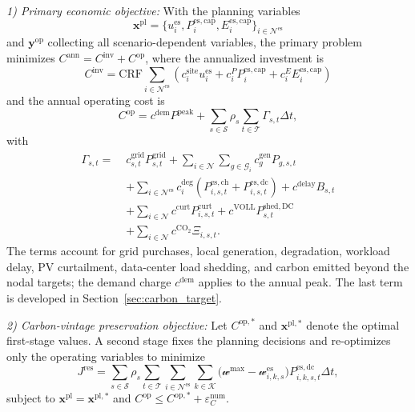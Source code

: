 \documentclass[journal]{IEEEtran}
\begin{document}
\emph{1) Primary economic objective:}
With the planning variables
\begin{equation}
\boldsymbol{x}^{\mathrm{pl}}
=
\{u_i^{\mathrm{es}},P_i^{\mathrm{es,cap}},E_i^{\mathrm{es,cap}}\}_{i\in\mathcal{N}^{\mathrm{es}}}
\label{eq:planning_variables}
\end{equation}
and $\boldsymbol{y}^{\mathrm{op}}$ collecting all scenario-dependent
variables, the primary problem minimizes
$C^{\mathrm{ann}}=C^{\mathrm{inv}}+C^{\mathrm{op}}$, where the annualized
investment is
\begin{equation}
C^{\mathrm{inv}}
=
\mathrm{CRF}
\!\!\sum_{i\in\mathcal{N}^{\mathrm{es}}}\!\!
\left(
c_i^{\mathrm{site}}u_i^{\mathrm{es}}
+
c_i^P P_i^{\mathrm{es,cap}}
+
c_i^E E_i^{\mathrm{es,cap}}
\right)
\label{eq:investment_cost}
\end{equation}
and the annual operating cost is
\begin{equation}
C^{\mathrm{op}}
=c^{\mathrm{dem}}P^{\mathrm{peak}}
+\sum_{s\in\mathcal{S}}\rho_s
\sum_{t\in\mathcal{T}}
\Gamma_{s,t}\Delta t,
\label{eq:operating_cost}
\end{equation}
with
\begin{align}
\Gamma_{s,t}
=\;&c_{s,t}^{\mathrm{grid}}P_{s,t}^{\mathrm{grid}}
+\sum_{i\in\mathcal{N}}\sum_{g\in\mathcal{G}_i}
c_g^{\mathrm{gen}}P_{g,s,t}
\nonumber\\
&+\sum_{i\in\mathcal{N}^{\mathrm{es}}}c_i^{\mathrm{deg}}
\left(P_{i,s,t}^{\mathrm{es,ch}}+P_{i,s,t}^{\mathrm{es,dc}}\right)
+c^{\mathrm{delay}}B_{s,t}
\nonumber\\
&+\sum_{i\in\mathcal{N}}c^{\mathrm{curt}}P_{i,s,t}^{\mathrm{curt}}
+c^{\mathrm{VOLL}}P_{s,t}^{\mathrm{shed,DC}}
\nonumber\\
&+\sum_{i\in\mathcal{N}}c^{\mathrm{CO_2}}\Xi_{i,s,t}.
\label{eq:interval_cost}
\end{align}
The terms account for grid purchases, local generation, degradation,
workload delay, PV curtailment, data-center load shedding, and carbon
emitted beyond the nodal targets; the demand charge $c^{\mathrm{dem}}$
applies to the annual peak. The last term is developed in
Section~\ref{sec:carbon_target}.

\emph{2) Carbon-vintage preservation objective:}
Let $C^{\mathrm{op},*}$ and $\boldsymbol{x}^{\mathrm{pl},*}$ denote the
optimal first-stage values. A second stage fixes the planning decisions
and re-optimizes only the operating variables to minimize
\begin{equation}
J^{\mathrm{res}}
=
\sum_{s\in\mathcal{S}}\rho_s
\sum_{t\in\mathcal{T}}
\sum_{i\in\mathcal{N}^{\mathrm{es}}}
\sum_{k\in\mathcal{K}}
\bigl(
\mathscr{w}^{\max}-\mathscr{w}_{i,k,s}^{\mathrm{es}}
\bigr)
P_{i,k,s,t}^{\mathrm{es,dc}}
\Delta t,
\label{eq:reserve_objective}
\end{equation}
subject to $\boldsymbol{x}^{\mathrm{pl}}=\boldsymbol{x}^{\mathrm{pl},*}$
and $C^{\mathrm{op}}\leq C^{\mathrm{op},*}+\varepsilon_C^{\mathrm{num}}$.
\end{document}
